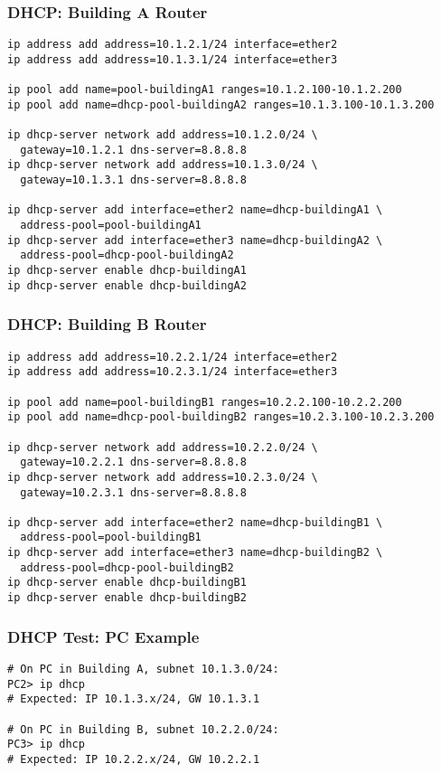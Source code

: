 \documentclass{beamer}
\begin{document}
\begin{frame}[fragile,label=dhcp-building-a]
\frametitle{DHCP: Building A Router}
\begin{lstlisting}
ip address add address=10.1.2.1/24 interface=ether2
ip address add address=10.1.3.1/24 interface=ether3

ip pool add name=pool-buildingA1 ranges=10.1.2.100-10.1.2.200
ip pool add name=dhcp-pool-buildingA2 ranges=10.1.3.100-10.1.3.200

ip dhcp-server network add address=10.1.2.0/24 \
  gateway=10.1.2.1 dns-server=8.8.8.8
ip dhcp-server network add address=10.1.3.0/24 \
  gateway=10.1.3.1 dns-server=8.8.8.8

ip dhcp-server add interface=ether2 name=dhcp-buildingA1 \
  address-pool=pool-buildingA1
ip dhcp-server add interface=ether3 name=dhcp-buildingA2 \
  address-pool=dhcp-pool-buildingA2
ip dhcp-server enable dhcp-buildingA1
ip dhcp-server enable dhcp-buildingA2
\end{lstlisting}
\end{frame}

\begin{frame}[fragile,label=dhcp-building-b]
\frametitle{DHCP: Building B Router}
\begin{lstlisting}
ip address add address=10.2.2.1/24 interface=ether2
ip address add address=10.2.3.1/24 interface=ether3

ip pool add name=pool-buildingB1 ranges=10.2.2.100-10.2.2.200
ip pool add name=dhcp-pool-buildingB2 ranges=10.2.3.100-10.2.3.200

ip dhcp-server network add address=10.2.2.0/24 \
  gateway=10.2.2.1 dns-server=8.8.8.8
ip dhcp-server network add address=10.2.3.0/24 \
  gateway=10.2.3.1 dns-server=8.8.8.8

ip dhcp-server add interface=ether2 name=dhcp-buildingB1 \
  address-pool=pool-buildingB1
ip dhcp-server add interface=ether3 name=dhcp-buildingB2 \
  address-pool=dhcp-pool-buildingB2
ip dhcp-server enable dhcp-buildingB1
ip dhcp-server enable dhcp-buildingB2
\end{lstlisting}
\end{frame}

\begin{frame}[fragile,label=dhcp-test-pc]
\frametitle{DHCP Test: PC Example}
\begin{lstlisting}
# On PC in Building A, subnet 10.1.3.0/24:
PC2> ip dhcp
# Expected: IP 10.1.3.x/24, GW 10.1.3.1

# On PC in Building B, subnet 10.2.2.0/24:
PC3> ip dhcp
# Expected: IP 10.2.2.x/24, GW 10.2.2.1
\end{lstlisting}
\end{frame}
\end{document}
